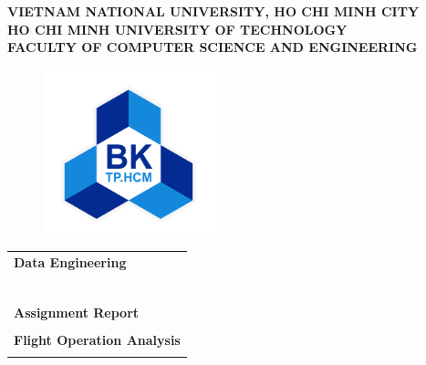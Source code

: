 \documentclass[12pt,a4paper]{article}
\begin{document}
\begin{titlepage}

    \begin{center}
        \large \textbf{VIETNAM NATIONAL UNIVERSITY, HO CHI MINH CITY} \\
        \large \textbf{HO CHI MINH UNIVERSITY OF TECHNOLOGY} \\
        \large \textbf{FACULTY OF COMPUTER SCIENCE AND ENGINEERING}
    \end{center}

    \begin{figure}[h!]
        \begin{center}
            \includegraphics[width=5cm]{Images/hcmut.png}
        \end{center}
    \end{figure}

    \begin{center}
        \begin{tabular}{c}
        \multicolumn{1}{l}{\textbf{{\Large Data Engineering}}}\\
        ~~\\
        \hline
        \\
        \multicolumn{1}{l}{\textbf{{\Large Assignment Report}}}\\
        \\
        \textbf{{\Huge Flight Operation Analysis}}\\
        \\
        \hline
        \end{tabular}
        \end{center}


\end{titlepage}
\end{document}
